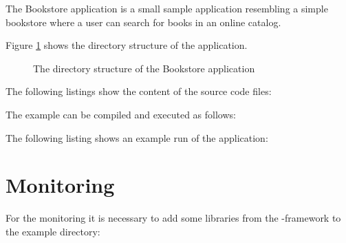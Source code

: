 The Bookstore application is a small sample application resembling a simple bookstore where a user can search for books in an online catalog.

Figure \ref{Figure:PlainBookstoreExample} shows the directory structure of the application.

\begin{figure}[H]
\begin{graybox}
\end{graybox}

\caption{The directory structure of the Bookstore application}
\label{Figure:PlainBookstoreExample}
\end{figure}

\noindent The following listings show the content of the source code files:

\setJavaCodeListing





\noindent The example can be compiled and executed as follows:
\setBashListing


\noindent The following listing shows an example run of the application:


\section{Monitoring}\label{sec:example:monitoring}
For the monitoring it is necessary to add some libraries from the \Kieker{}-framework to the example directory:
\begin{figure}[H]
\begin{graybox}
\end{graybox}
\end{figure}

